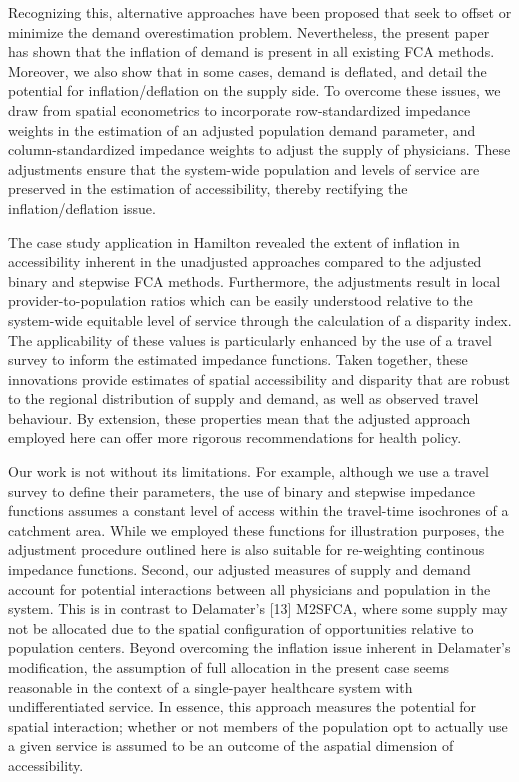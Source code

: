 \documentclass[10pt,letterpaper]{article}
\begin{document}
Recognizing this, alternative approaches have been proposed that seek to
offset or minimize the demand overestimation problem. Nevertheless, the
present paper has shown that the inflation of demand is present in all
existing FCA methods. Moreover, we also show that in some cases, demand
is deflated, and detail the potential for inflation/deflation on the
supply side. To overcome these issues, we draw from spatial econometrics
to incorporate row-standardized impedance weights in the estimation of
an adjusted population demand parameter, and column-standardized
impedance weights to adjust the supply of physicians. These adjustments
ensure that the system-wide population and levels of service are
preserved in the estimation of accessibility, thereby rectifying the
inflation/deflation issue.

The case study application in Hamilton revealed the extent of inflation
in accessibility inherent in the unadjusted approaches compared to the
adjusted binary and stepwise FCA methods. Furthermore, the adjustments
result in local provider-to-population ratios which can be easily
understood relative to the system-wide equitable level of service
through the calculation of a disparity index. The applicability of these
values is particularly enhanced by the use of a travel survey to inform
the estimated impedance functions. Taken together, these innovations
provide estimates of spatial accessibility and disparity that are robust
to the regional distribution of supply and demand, as well as observed
travel behaviour. By extension, these properties mean that the adjusted
approach employed here can offer more rigorous recommendations for
health policy.

Our work is not without its limitations. For example, although we use a
travel survey to define their parameters, the use of binary and stepwise
impedance functions assumes a constant level of access within the
travel-time isochrones of a catchment area. While we employed these
functions for illustration purposes, the adjustment procedure outlined
here is also suitable for re-weighting continous impedance functions.
Second, our adjusted measures of supply and demand account for potential
interactions between all physicians and population in the system. This
is in contrast to Delamater's {[}13{]} M2SFCA, where some supply may not
be allocated due to the spatial configuration of opportunities relative
to population centers. Beyond overcoming the inflation issue inherent in
Delamater's modification, the assumption of full allocation in the
present case seems reasonable in the context of a single-payer
healthcare system with undifferentiated service. In essence, this
approach measures the potential for spatial interaction; whether or not
members of the population opt to actually use a given service is assumed
to be an outcome of the aspatial dimension of accessibility.
\end{document}
